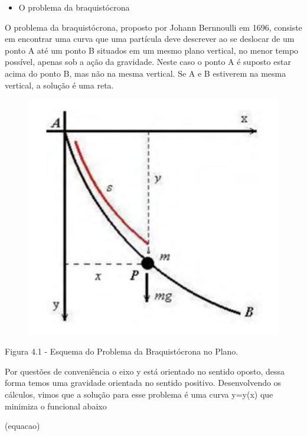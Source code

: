 \documentclass[12pt, a4paper]{article}
\begin{document}
\begin{itemize}
\item O problema da braquistócrona
\end{itemize}

O problema da braquistócrona, proposto por Johann Bernnoulli em 1696, consiste em encontrar uma curva que uma partícula deve descrever ao se deslocar de um ponto A até um ponto B situados em um mesmo plano vertical, no menor tempo possível, apenas sob a ação da gravidade. Neste caso o ponto A é suposto estar acima do ponto B, mas não na mesma vertical. Se A e B estiverem na mesma vertical, a solução é uma reta.


\begin{figure}[!h]
    \centering
    \includegraphics[scale=1.2]{imgs/braquistocrona.png}

  \end{figure}

Figura 4.1 - Esquema do Problema da Braquistócrona no Plano.

Por questões de conveniência o eixo y está orientado no sentido oposto, dessa forma temos uma gravidade orientada no sentido positivo. Desenvolvendo os cálculos, vimos que a solução para esse problema é uma curva y=y(x) que minimiza o funcional abaixo

\begin{center}
(equacao)
\end{center}
\end{document}
